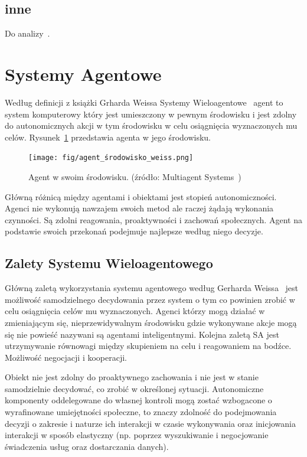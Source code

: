 \documentclass[11pt]{report}
\begin{document}
    \subsection{inne}\label{subsec:inne}
    Do analizy~\cite{Buckingham2020,Levin2018,Yuan2017}.


    \section{Systemy Agentowe}
    Według definicji z książki Grharda Weissa Systemy Wieloagentowe~\cite{55066420130101} agent to system komputerowy który jest umieszczony w pewnym środowisku i jest zdolny do autonomicznych akcji w tym środowisku w celu osiągnięcia wyznaczonych mu celów.
    Rysunek~\ref{fig:agent} przedstawia agenta w jego środowisku.
    \begin{figure}[!htp]
        \centering
        \texttt{[image: fig/agent\_środowisko\_weiss.png]}
        \caption{Agent w swoim środowisku. (źródło: Multiagent Systems~\cite{55066420130101})}
        \label{fig:agent}
    \end{figure}
    Główną różnicą między agentami i obiektami jest stopień autonomiczności.
    Agenci nie wykonują nawzajem swoich metod ale raczej żądają wykonania czynności.
    Są zdolni reagowania, proaktywności i zachowań społecznych.
    Agent na podstawie swoich przekonań podejmuje najlepsze według niego decyzje.

    \subsection{Zalety Systemu Wieloagentowego}
    Główną zaletą wykorzystania systemu agentowego według Gerharda Weissa~\cite{55066420130101} jest możliwość samodzielnego decydowania przez system o tym co powinien zrobić w celu osiągnięcia celów mu wyznaczonych.
    Agenci którzy mogą działać w zmieniającym się, nieprzewidywalnym środowisku gdzie wykonywane akcje mogą się nie powieść nazywani są agentami inteligentnymi.
    Kolejna zaletą SA jest utrzymywanie równowagi między skupieniem na celu i reagowaniem na bodźce.
    Możliwość negocjacji i kooperacji.

    Obiekt nie jest zdolny do proaktywnego zachowania i nie jest w stanie samodzielnie decydować, co zrobić w określonej sytuacji.
    Autonomiczne komponenty oddelegowane do własnej kontroli mogą zostać wzbogacone o wyrafinowane umiejętności społeczne, to znaczy zdolność do podejmowania decyzji o zakresie i naturze ich interakcji w czasie wykonywania oraz inicjowania interakcji w sposób elastyczny (np. poprzez wyszukiwanie i negocjowanie świadczenia usług oraz dostarczania danych).
\end{document}
